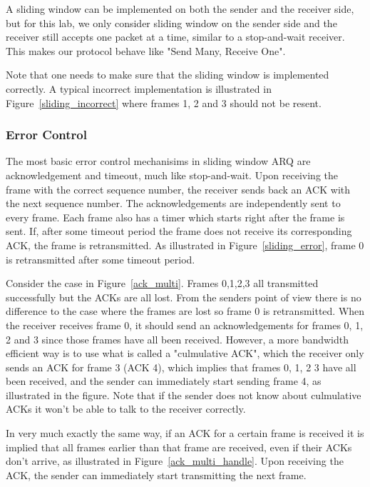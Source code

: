 \documentclass[11pt]{article}
\begin{document}
A sliding window can be implemented on both the sender and the receiver side, but for this lab, we only consider sliding window on the sender side and the receiver still accepts one packet
at a time, similar to a stop-and-wait receiver. This makes our protocol behave like "Send Many, Receive One".

Note that one needs to make sure that the sliding window is implemented correctly.
A typical incorrect implementation is illustrated in Figure~\ref{sliding_incorrect} where frames 1, 2 and 3 should not be resent.


\subsubsection{Error Control}
The most basic error control mechanisims in sliding window ARQ are acknowledgement and timeout, much like stop-and-wait.
Upon receiving the frame with the correct sequence number, the receiver sends back an ACK with the next sequence number.
The acknowledgements are independently sent to every frame.
Each frame also has a timer which starts right after the frame is sent.
If, after some timeout period the frame does not receive its corresponding ACK, the frame is retransmitted.
As illustrated in Figure~\ref{sliding_error}, frame 0 is retransmitted after some timeout period.

Consider the case in Figure~\ref{ack_multi}. Frames 0,1,2,3 all transmitted successfully but the ACKs are all lost.
From the senders point of view there is no difference to the case where the frames are lost so frame 0 is retransmitted.
When the receiver receives frame 0, it should send an acknowledgements for frames 0, 1, 2 and 3 since those frames have all been received.
However, a more bandwidth efficient way is to use what is called a "culmulative ACK", which the receiver only sends an ACK for frame 3 (ACK 4), which implies that frames 0, 1, 2 3 have all been received, and the sender can immediately start sending frame 4, as illustrated in the figure.
Note that if the sender does not know about culmulative ACKs it won't be able to talk to the receiver correctly.

In very much exactly the same way, if an ACK for a certain frame is received it is implied that all frames earlier than that frame are received, even if their ACKs don't arrive, as illustrated in Figure~\ref{ack_multi_handle}.
Upon receiving the ACK, the sender can immediately start transmitting the next frame.
\end{document}

